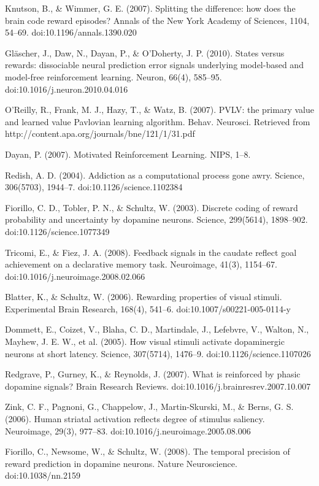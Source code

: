 Knutson, B., & Wimmer, G. E. (2007). Splitting the difference: how does the brain code reward episodes? Annals of the New York Academy of Sciences, 1104, 54–69. doi:10.1196/annals.1390.020

Gläscher, J., Daw, N., Dayan, P., & O'Doherty, J. P. (2010). States versus rewards: dissociable neural prediction error signals underlying model-based and model-free reinforcement learning. Neuron, 66(4), 585–95. doi:10.1016/j.neuron.2010.04.016

O'Reilly, R., Frank, M. J., Hazy, T., & Watz, B. (2007). PVLV: the primary value and learned value Pavlovian learning algorithm. Behav. Neurosci. Retrieved from http://content.apa.org/journals/bne/121/1/31.pdf

Dayan, P. (2007). Motivated Reinforcement Learning. NIPS, 1–8.

Redish, A. D. (2004). Addiction as a computational process gone awry. Science, 306(5703), 1944–7. doi:10.1126/science.1102384

Fiorillo, C. D., Tobler, P. N., & Schultz, W. (2003). Discrete coding of reward probability and uncertainty by dopamine neurons. Science, 299(5614), 1898–902. doi:10.1126/science.1077349

Tricomi, E., & Fiez, J. A. (2008). Feedback signals in the caudate reflect goal achievement on a declarative memory task. Neuroimage, 41(3), 1154–67. doi:10.1016/j.neuroimage.2008.02.066

Blatter, K., & Schultz, W. (2006). Rewarding properties of visual stimuli. Experimental Brain Research, 168(4), 541–6. doi:10.1007/s00221-005-0114-y

Dommett, E., Coizet, V., Blaha, C. D., Martindale, J., Lefebvre, V., Walton, N., Mayhew, J. E. W., et al. (2005). How visual stimuli activate dopaminergic neurons at short latency. Science, 307(5714), 1476–9. doi:10.1126/science.1107026

Redgrave, P., Gurney, K., & Reynolds, J. (2007). What is reinforced by phasic dopamine signals? Brain Research Reviews. doi:10.1016/j.brainresrev.2007.10.007

Zink, C. F., Pagnoni, G., Chappelow, J., Martin-Skurski, M., & Berns, G. S. (2006). Human striatal activation reflects degree of stimulus saliency. Neuroimage, 29(3), 977–83. doi:10.1016/j.neuroimage.2005.08.006

Fiorillo, C., Newsome, W., & Schultz, W. (2008). The temporal precision of reward prediction in dopamine neurons. Nature Neuroscience. doi:10.1038/nn.2159

